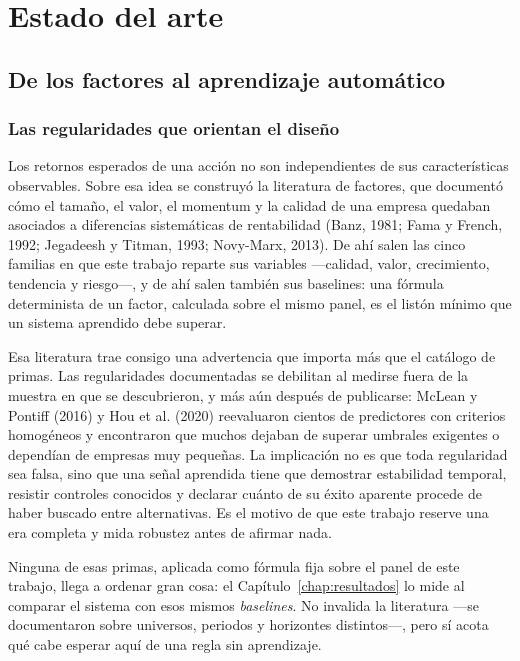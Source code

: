 \chapter{Estado del arte}
\label{chap:estado-arte}

\section{De los factores al aprendizaje automático}

\subsection{Las regularidades que orientan el diseño}

Los retornos esperados de una acción no son independientes de sus características observables. Sobre
esa idea se construyó la literatura de factores, que documentó cómo el tamaño, el valor, el momentum
y la calidad de una empresa quedaban asociados a diferencias sistemáticas de rentabilidad (Banz,
1981; Fama y French, 1992; Jegadeesh y Titman, 1993; Novy-Marx, 2013). De ahí salen las cinco
familias en que este trabajo reparte sus variables ---calidad, valor, crecimiento, tendencia y
riesgo---, y de ahí salen también sus baselines: una fórmula determinista de un factor, calculada
sobre el mismo panel, es el listón mínimo que un sistema aprendido debe superar.

Esa literatura trae consigo una advertencia que importa más que el catálogo de primas. Las
regularidades documentadas se debilitan al medirse fuera de la muestra en que se descubrieron, y
más aún después de publicarse: McLean y Pontiff (2016) y Hou et al. (2020) reevaluaron cientos de
predictores con criterios homogéneos y encontraron que muchos dejaban de superar umbrales exigentes
o dependían de empresas muy pequeñas. La implicación no es que toda
regularidad sea falsa, sino que una señal aprendida tiene que demostrar estabilidad temporal,
resistir controles conocidos y declarar cuánto de su éxito aparente procede de haber buscado entre
alternativas. Es el motivo de que este trabajo reserve una era completa y mida robustez antes de
afirmar nada.

Ninguna de esas primas, aplicada como fórmula fija sobre el panel de este trabajo, llega a ordenar
gran cosa: el Capítulo~\ref{chap:resultados} lo mide al comparar el sistema con esos mismos
\textit{baselines}. No invalida la literatura ---se documentaron sobre universos, periodos y
horizontes distintos---, pero sí acota qué cabe esperar aquí de una regla sin aprendizaje.

